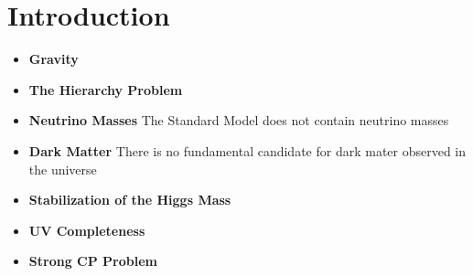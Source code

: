 \chapter{Introduction\label{ch:intro}}






\begin{itemize}
\item \textbf{Gravity}
\item \textbf{The Hierarchy Problem}
\item \textbf{Neutrino Masses} The Standard Model does not contain neutrino masses 
\item \textbf{Dark Matter} There is no fundamental candidate for dark mater observed in the universe 
\item \textbf{Stabilization of the Higgs Mass} 
\item \textbf{UV Completeness} 
\item \textbf{Strong CP Problem}
\end{itemize}
